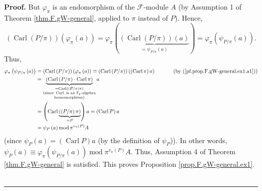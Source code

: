 \documentclass[numbers=enddot,12pt,final,onecolumn,notitlepage]{scrartcl}%
\theoremstyle{definition}
\newenvironment{proof}[1][Proof]{\noindent\textbf{#1.} }{\ \rule{0.5em}{0.5em}}
\begin{document}
\begin{proof}
But $\varphi_{\pi}$ is an endomorphism of the $\mathcal{F}$-module $A$ (by
Assumption 1 of Theorem \ref{thm.F.gW-general}, applied to $\pi$ instead of
$P$). Hence,%
\[
\left(  \operatorname*{Carl}\left(  P/\pi\right)  \right)  \left(
\varphi_{\pi}\left(  a\right)  \right)  =\varphi_{\pi}\left(
\underbrace{\left(  \operatorname*{Carl}\left(  P/\pi\right)  \right)  \left(
a\right)  }_{=\psi_{P/\pi}\left(  a\right)  }\right)  =\varphi_{\pi}\left(
\psi_{P/\pi}\left(  a\right)  \right)  .
\]
Thus,%
\begin{align*}
\varphi_{\pi}\left(  \psi_{P/\pi}\left(  a\right)  \right)   &  =\left(
\operatorname*{Carl}\left(  P/\pi\right)  \right)  \left(  \varphi_{\pi
}\left(  a\right)  \right)  \equiv\left(  \operatorname*{Carl}\left(
P/\pi\right)  \right)  \left(  \left(  \operatorname*{Carl}\pi\right)
a\right)  \ \ \ \ \ \ \ \ \ \ \left(  \text{by
(\ref{pf.prop.F.gW-general.ex1.a1})}\right) \\
&  =\underbrace{\left(  \operatorname*{Carl}\left(  P/\pi\right)
\cdot\operatorname*{Carl}\pi\right)  }_{\substack{=\operatorname*{Carl}\left(
\left(  P/\pi\right)  \pi\right)  \\\text{(since }\operatorname*{Carl}\text{
is an }\mathbb{F}_{q}\text{-algebra}\\\text{homomorphism)}}}a\\
&  =\left(  \operatorname*{Carl}\underbrace{\left(  \left(  P/\pi\right)
\pi\right)  }_{=P}\right)  a=\left(  \operatorname*{Carl}P\right)  a\\
&  =\psi_{P}\left(  a\right)  \operatorname{mod}\pi^{v_{\pi}\left(  P\right)
}A
\end{align*}
(since $\psi_{P}\left(  a\right)  =\left(  \operatorname*{Carl}P\right)  a$
(by the definition of $\psi_{P}$)). In other words, $\psi_{P}\left(  a\right)
\equiv\varphi_{\pi}\left(  \psi_{P/\pi}\left(  a\right)  \right)
\operatorname{mod}\pi^{v_{\pi}\left(  P\right)  }A$. Thus, Assumption 4 of
Theorem \ref{thm.F.gW-general} is satisfied. This proves Proposition
\ref{prop.F.gW-general.ex1}.
\end{proof}
\end{document}
